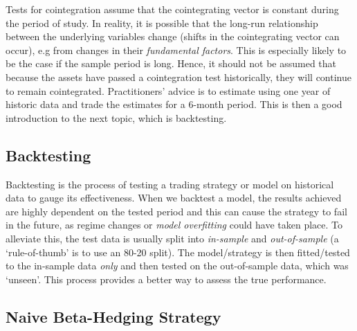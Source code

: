 \documentclass[11pt]{article}
\begin{document}
Tests for cointegration assume that the cointegrating vector is constant
during the period of study. In reality, it is possible that the long-run
relationship between the underlying variables change (shifts in the
cointegrating vector can occur), e.g from changes in their
\emph{fundamental factors}. This is especially likely to be the case if
the sample period is long. Hence, it should not be assumed that because
the assets have passed a cointegration test historically, they will
continue to remain cointegrated. Practitioners' advice is to estimate
using one year of historic data and trade the estimates for a 6-month
period.
This is then a good introduction to the next topic, which is
backtesting.

    \subsection{Backtesting}\label{backtesting}
    
Backtesting is the process of testing a trading strategy or model on
historical data to gauge its effectiveness. When we backtest a model,
the results achieved are highly dependent on the tested period and this
can cause the strategy to fail in the future, as regime changes or
\emph{model overfitting} could have taken place.
To alleviate this, the test data is usually split into \emph{in-sample}
and \emph{out-of-sample} (a `rule-of-thumb' is to use an 80-20 split).
The model/strategy is then fitted/tested to the in-sample data
\emph{only} and then tested on the out-of-sample data, which was
`unseen'. This process provides a better way to assess the true
performance.

    \subsection{Naive Beta-Hedging Strategy}\label{naive-beta-hedging-strategy}
    
\end{document}
